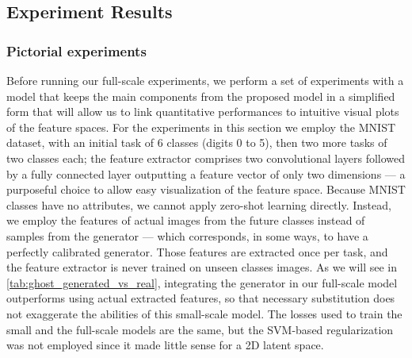\subsection{Experiment Results}
\label{sec:ghost_exp}

\subsubsection{Pictorial experiments}
\label{sec:ghost_pictorial}

Before running our full-scale experiments, we perform a set of experiments with a model that keeps
the main components from the proposed model in a simplified form that will allow us to link
quantitative performances to intuitive visual plots of the feature spaces. For the experiments in
this section we employ the MNIST \citep{lecun2010mnist} dataset, with an initial task of 6 classes
(digits 0 to 5), then two more tasks of two classes each; the feature extractor comprises two
convolutional layers followed by a fully connected layer outputting a feature vector of only two
dimensions — a purposeful choice to allow easy visualization of the feature space. Because MNIST
classes have no attributes, we cannot apply zero-shot learning directly. Instead, we employ the
features of actual images from the future classes instead of samples from the generator — which
corresponds, in some ways, to have a perfectly calibrated generator. Those features are extracted
once per task, and the feature extractor is never trained on unseen classes images. As we will see
in \autoref{tab:ghost_generated_vs_real}, integrating the generator in our full-scale model
outperforms using actual extracted features, so that necessary substitution does not exaggerate the
abilities of this small-scale model. The losses used to train the small and the full-scale models
are the same, but the SVM-based regularization was not employed since it made little sense for a 2D
latent space.

